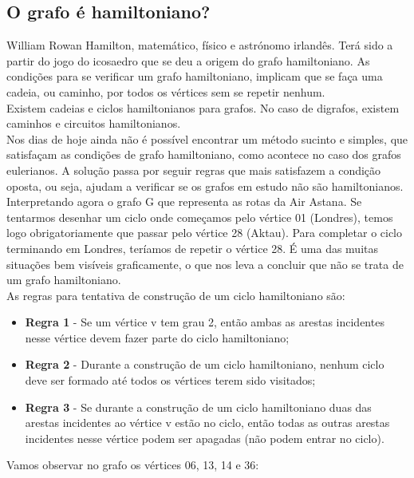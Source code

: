 \subsection{ O grafo é hamiltoniano? }
William Rowan Hamilton, matemático, físico e astrónomo irlandês. Terá sido a partir do jogo do icosaedro
que se deu a origem do grafo hamiltoniano. As condições para se verificar um grafo hamiltoniano, implicam
que se faça uma cadeia, ou caminho, por todos os vértices sem se repetir nenhum.\\
\indent Existem cadeias e ciclos hamiltonianos para grafos. No caso de digrafos, existem caminhos e circuitos 
hamiltonianos.\\
\indent Nos dias de hoje ainda não é possível encontrar um método sucinto e simples, que satisfaçam as
condições de grafo hamiltoniano, como acontece no caso dos grafos eulerianos. A solução passa por seguir 
regras que mais satisfazem a condição oposta, ou seja, ajudam a verificar se os grafos em estudo não são 
hamiltonianos.\\
\indent Interpretando agora o grafo G que representa as rotas da Air Astana. Se tentarmos desenhar um ciclo 
onde começamos pelo vértice 01 (Londres), temos logo obrigatoriamente que passar pelo vértice 28 (Aktau). 
Para completar o ciclo terminando em Londres, teríamos de repetir o vértice 28. É uma das muitas situações 
bem visíveis graficamente, o que nos leva a concluir que não se trata de um grafo hamiltoniano.\\
\indent As regras para tentativa de construção de um ciclo hamiltoniano são:\\
\begin{itemize}
    \item \textbf{Regra 1} - Se um vértice v tem grau 2, então ambas as arestas incidentes nesse vértice devem fazer parte 
    do ciclo hamiltoniano;\\
    \item  \textbf{Regra 2} -  Durante a construção de um ciclo hamiltoniano, nenhum ciclo deve ser formado até todos os 
    vértices terem sido visitados;\\
    \item \textbf{Regra 3} - Se durante a construção de um ciclo hamiltoniano duas das arestas incidentes ao vértice v estão 
    no ciclo, então todas as outras arestas incidentes nesse vértice podem ser apagadas (não podem entrar no 
    ciclo).
\end{itemize}
\clearpage
\indent Vamos observar no grafo os vértices 06, 13, 14 e 36:
